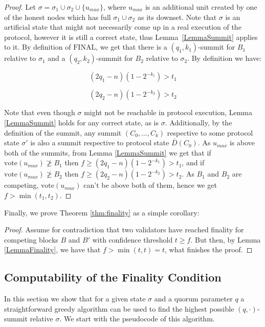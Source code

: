 \documentclass[12pt, fleqn]{article}
\newcommand{\vote}{\mathrm{vote}}
\newcommand{\final}{\mathrm{FINAL}}
\begin{document}
\begin{proof}

Let $\sigma = \sigma_1\cup\sigma_2 \cup \{u_{max}\}$, where $u_{max}$ is an additional unit created by one of the honest nodes which has full $\sigma_1\cup\sigma_2$ as its downset.
Note that $\sigma$ is an artificial state that might not necessarily come up in a real execution of the protocol, however it is still a correct state, thus Lemma~\ref{LemmaSummit} applies to it.
%
By definition of $\final$, we get that there is a $(q_1,k_1)$-summit for $B_1$ relative to $\sigma_1$ and a $(q_2,k_2)$-summit for $B_2$ relative to $\sigma_2$.
By definition we have: 

\begin{equation}\label{EquationFinality1}
(2q_1-n)(1-2^{-k_1})>t_1
\end{equation}

\vspace*{-0.9cm}

\begin{equation}\label{EquationFinality2}
(2q_2-n)(1-2^{-k_2})>t_2
\end{equation}

Note that even though $\sigma$ might not be reachable in protocol execution, Lemma \ref{LemmaSummit} holds for any correct state, as is $\sigma$.
Additionally, by the definition of the summit, any summit $(C_0,\dots,C_k)$ respective to some protocol state $\sigma'$ is also a summit respective to protocol state $\bar{D}(C_0)$.
As $u_{max}$ is above both of the summits, from Lemma \ref{LemmaSummit} we get that if $\vote(u_{max})\not\geq B_1$ then $f\geq (2q_1-n)(1-2^{-k_1})>t_1$, and if  $\vote(u_{max})\not\geq B_2$ then $f\geq (2q_2-n)(1-2^{-k_2})>t_2$.
As $B_1$ and $B_2$ are competing, $\vote(u_{max})$ can't be above both of them, hence we get $f>\min(t_1,t_2)$.

\end{proof}

Finally, we prove Theorem \ref{thm:finality} as a simple corollary:

\begin{proof}
Assume for contradiction that two validators have reached finality for competing blocks $B$ and $B'$ with confidence threshold $t\geq f$.
But then, by Lemma \ref{LemmaFinality}, we have that $f>\min(t,t)=t$, what finishes the proof.
\end{proof}


\subsection{Computability of the Finality Condition}
In this section we show that for a given state $\sigma$ and a quorum parameter $q$ a straightforward greedy algorithm can be used to find the highest possible $(q,\cdot)$-summit relative $\sigma$. 
%
We start with the pseudocode of this algorithm.
\end{document}
